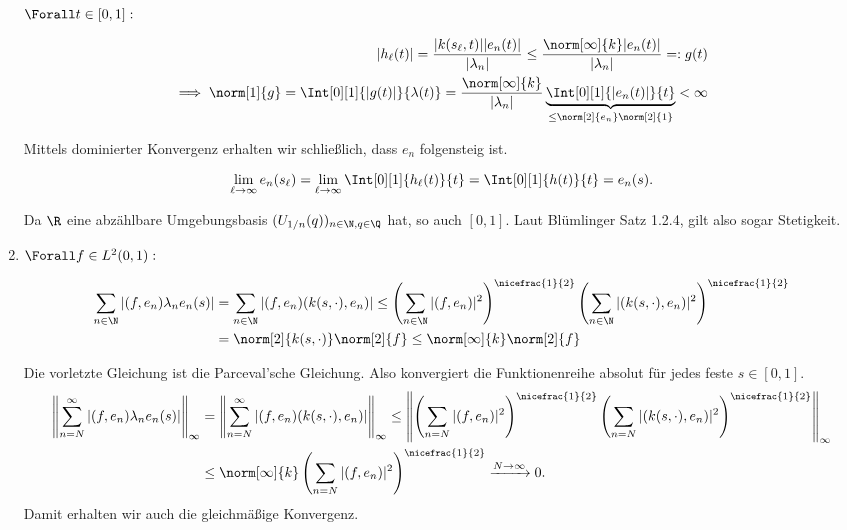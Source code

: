 \begin{solution}
\begin{enumerate}[label = (\alph*)]
  $\Forall t \in [0, 1]:$

  \begin{align*}
    |h_\ell(t)|
    =
    \frac
    {
      |k(s_\ell, t)|
      |e_n(t)|
    }
    {|\lambda_n|}
    \leq
    \frac
    {
      \norm[\infty]{k}
      |e_n(t)|
    }
    {|\lambda_n|}
    =:
    g(t) \\
    \implies
    \norm[1]{g}
    =
    \Int[0][1]
    {|g(t)|}{\lambda(t)}
    =
    \frac
    {\norm[\infty]{k}}
    {|\lambda_n|}
    \underbrace
    {
      \Int[0][1]
      {|e_n(t)|}{t}
    }_{
      \leq
      \norm[2]{e_n}
      \norm[2]{1}
    }
    < \infty
  \end{align*}

  Mittels dominierter Konvergenz
  erhalten wir schließlich, dass $e_n$ folgensteig ist.

  \begin{align*}
    \lim_{\ell \to \infty}
    e_n(s_\ell)
    =
    \lim_{\ell \to \infty}
    \Int[0][1]{h_\ell(t)}{t}
    =
    \Int[0][1]{h(t)}{t}
    =
    e_n(s).
  \end{align*}


  Da $\R$ eine abzählbare Umgebungsbasis $(U_{1/n}(q))_{n \in \N, q \in \Q}$ hat, so auch $[0, 1]$.
  Laut Blümlinger Satz 1.2.4, gilt also sogar Stetigkeit.

  \item
  $\Forall f \in L^2(0, 1):$

  \begin{align*}
    \sum_{n \in \N}
    |(f, e_n)\lambda_n e_n(s)|
     &= \sum_{n \in \N}
     |(f, e_n)(k(s,\cdot),e_n)| \leq
     \left(\sum_{n \in \N}
     |(f, e_n)|^2\right)^{\nicefrac{1}{2}}
     \left(\sum_{n \in \N}|(k(s,\cdot),e_n)|^2\right)^{\nicefrac{1}{2}} \\
    &= \norm[2]{k(s,\cdot)}\norm[2]{f} \leq\norm[\infty]{k}\norm[2]{f}
  \end{align*}

  Die vorletzte Gleichung ist die Parceval'sche Gleichung.
  Also konvergiert die Funktionenreihe absolut für jedes feste $s \in [0,1]$.
  \begin{align*}
    \left\|\sum_{n = N}^{\infty}
    |(f, e_n)\lambda_n e_n(s)|\right\|_{\infty}
     &= \left\|\sum_{n = N}^{\infty}
     |(f, e_n)(k(s,\cdot),e_n)|\right\|_{\infty} \leq
     \left\|\left(\sum_{n = N}
     |(f, e_n)|^2\right)^{\nicefrac{1}{2}}
     \left(\sum_{n = N}|(k(s,\cdot),e_n)|^2\right)^{\nicefrac{1}{2}}\right\|_{\infty} \\
    &\leq \norm[\infty]{k}\left(\sum_{n = N}|(f, e_n)|^2\right)^{\nicefrac{1}{2}}
    \xrightarrow{N \to \infty} 0.
  \end{align*}
  Damit erhalten wir auch die gleichmäßige Konvergenz.

\end{enumerate}

\end{solution}
